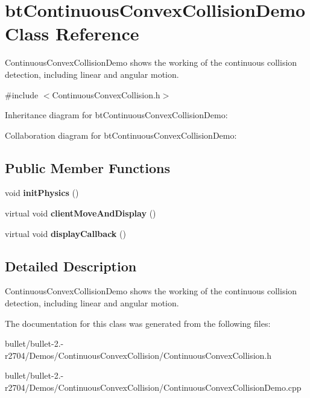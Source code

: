 \hypertarget{classbt_continuous_convex_collision_demo}{\section{bt\+Continuous\+Convex\+Collision\+Demo Class Reference}
\label{classbt_continuous_convex_collision_demo}
}


Continuous\+Convex\+Collision\+Demo shows the working of the continuous collision detection, including linear and angular motion.  




{\ttfamily \#include $<$Continuous\+Convex\+Collision.\+h$>$}



Inheritance diagram for bt\+Continuous\+Convex\+Collision\+Demo\+:


Collaboration diagram for bt\+Continuous\+Convex\+Collision\+Demo\+:
\subsection*{Public Member Functions}
\begin{DoxyCompactItemize}
\item 
\hypertarget{classbt_continuous_convex_collision_demo_adff792b8bca3bc40c0a0031c3dc88cc3}{void {\bfseries init\+Physics} ()}\label{classbt_continuous_convex_collision_demo_adff792b8bca3bc40c0a0031c3dc88cc3}

\item 
\hypertarget{classbt_continuous_convex_collision_demo_a4e9d387a2fbad27955b24c18a364d367}{virtual void {\bfseries client\+Move\+And\+Display} ()}\label{classbt_continuous_convex_collision_demo_a4e9d387a2fbad27955b24c18a364d367}

\item 
\hypertarget{classbt_continuous_convex_collision_demo_ac255ce19341449777eeca5ab6f105b54}{virtual void {\bfseries display\+Callback} ()}\label{classbt_continuous_convex_collision_demo_ac255ce19341449777eeca5ab6f105b54}

\end{DoxyCompactItemize}


\subsection{Detailed Description}
Continuous\+Convex\+Collision\+Demo shows the working of the continuous collision detection, including linear and angular motion. 

The documentation for this class was generated from the following files\+:\begin{DoxyCompactItemize}
\item 
bullet/bullet-\/2.-\/r2704/\+Demos/\+Continuous\+Convex\+Collision/Continuous\+Convex\+Collision.\+h\item 
bullet/bullet-\/2.-\/r2704/\+Demos/\+Continuous\+Convex\+Collision/Continuous\+Convex\+Collision\+Demo.\+cpp\end{DoxyCompactItemize}
